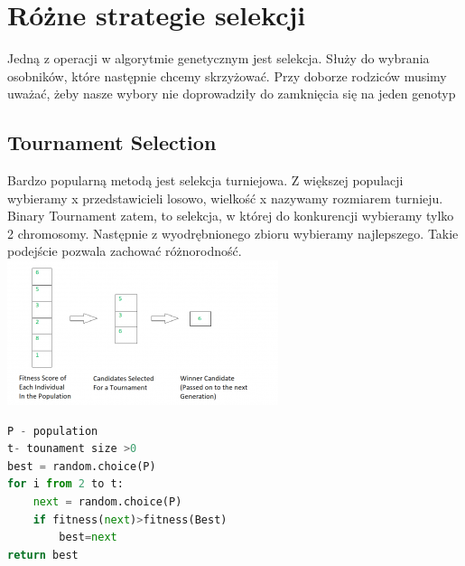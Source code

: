 \documentclass[11pt]{article}
\begin{document}
\section{Różne strategie selekcji}
Jedną z operacji w algorytmie genetycznym jest selekcja. Służy do wybrania osobników, które następnie chcemy skrzyżować. Przy doborze rodziców musimy uważać, żeby nasze wybory nie doprowadziły do zamknięcia się na jeden genotyp
\subsection{Tournament Selection}
Bardzo popularną metodą jest selekcja turniejowa. Z większej populacji wybieramy x przedstawicieli losowo, wielkość x nazywamy rozmiarem turnieju. Binary Tournament zatem, to selekcja, w której do konkurencji wybieramy tylko 2 chromosomy. Następnie z wyodrębnionego zbioru wybieramy najlepszego. Takie podejście pozwala zachować różnorodność.\\
\centering
\includegraphics[scale=1.0]{ts.png}\\
\begin{lstlisting}[language=Python]
P - population
t- tounament size >0
best = random.choice(P)
for i from 2 to t:
	next = random.choice(P)
	if fitness(next)>fitness(Best)
		best=next
return best
\end{lstlisting}
\flushleft
\end{document}
